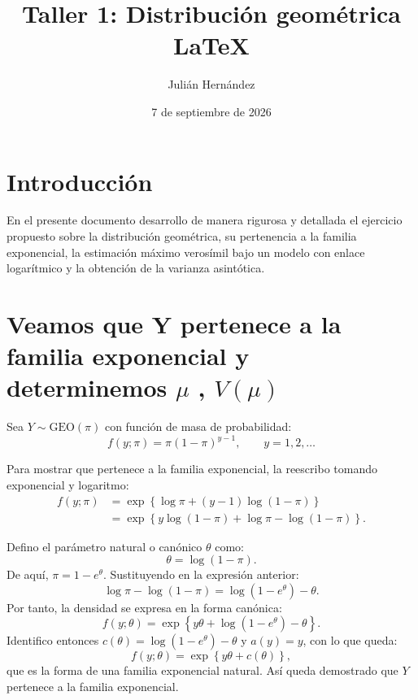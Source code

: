 \documentclass{article}
\title{Taller 1: Distribución geométrica \LaTeX}
\author{Julián Hernández}
\date{7 de septiembre de 2026}
\begin{document}
\maketitle

\section{Introducción}
En el presente documento desarrollo de manera rigurosa y detallada el ejercicio propuesto sobre la distribución geométrica, su pertenencia a la familia exponencial, la estimación máximo verosímil bajo un modelo con enlace logarítmico y la obtención de la varianza asintótica. 

\section{Veamos que Y pertenece a la familia exponencial y determinemos  $\mu$ , $V(\mu)$}

Sea $Y \sim \text{GEO}(\pi)$ con función de masa de probabilidad:
\begin{equation}
f(y;\pi) = \pi (1-\pi)^{y-1}, \qquad y = 1,2,\ldots
\end{equation}

Para mostrar que pertenece a la familia exponencial, la reescribo tomando exponencial y logaritmo:
\begin{align}
f(y;\pi) &= \exp\left\{\log \pi + (y-1)\log(1-\pi)\right\} \nonumber \\
         &= \exp\left\{ y\log(1-\pi) + \log \pi - \log(1-\pi) \right\}.
\end{align}

Defino el parámetro natural o canónico $\theta$ como:
\begin{equation}
\theta = \log(1-\pi).
\end{equation}
De aquí, $\pi = 1 - e^\theta$. Sustituyendo en la expresión anterior:
\begin{equation}
\log \pi - \log(1-\pi) = \log(1-e^\theta) - \theta.
\end{equation}
Por tanto, la densidad se expresa en la forma canónica:
\begin{equation}
f(y;\theta) = \exp\left\{ y\theta + \log(1-e^\theta) - \theta \right\}.
\end{equation}
Identifico entonces $c(\theta) = \log(1-e^\theta) - \theta$ y $a(y)=y$, con lo que queda:
\begin{equation}
f(y;\theta) = \exp\left\{ y\theta + c(\theta) \right\},
\end{equation}
que es la forma de una familia exponencial natural. Así queda demostrado que $Y$ pertenece a la familia exponencial.
\end{document}
